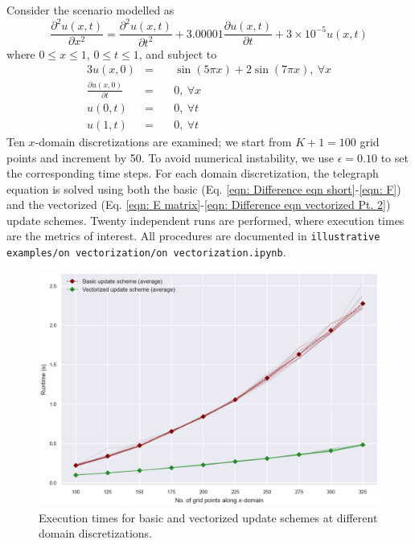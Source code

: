 \documentclass{article}
\begin{document}
Consider the scenario modelled as
\begin{equation}
   \label{eqn: Telegraph eqn for On Vectorization}
   \frac{\partial^{2} u \left(x,t\right)}{\partial x^{2}}
   =
   \frac{\partial^{2} u \left(x,t\right)}{\partial t^{2}}
   +
   3.00001 \frac{\partial u \left(x,t\right)}{\partial t}
   +
   3 \times 10^{-5} u \left(x,t\right)
\end{equation}
where $0 \leq x \leq 1$, $0 \leq t \leq 1$,
and subject to
\begin{alignat}{3}
   \label{eqn: mu for On Vectorization}
   u \left(x,0\right) &=\ && \sin \left(5 \pi x\right) + 2 \sin \left(7 \pi x\right),\ \forall x \\
   \label{eqn: xi for On Vectorization}
   \frac{\partial u \left(x,0\right)}{\partial t} &=\ && 0,\ \forall x \\
   \label{eqn: nu_0 for On Vectorization}
   u \left(0,t\right) &=\ && 0,\ \forall t \\
   \label{eqn: nu_X for On Vectorization}
   u \left(1,t\right) &=\ && 0,\ \forall t
\end{alignat}
Ten $x$-domain discretizations are examined;
we start from $K+1=100$ grid points and increment by 50.
To avoid numerical instability, we use $\epsilon = 0.10$ to set the corresponding time steps.
For each domain discretization, the telegraph equation is solved using both
the basic (Eq. \ref{eqn: Difference eqn short}-\ref{eqn: F})
and the vectorized (Eq. \ref{eqn: E matrix}-\ref{eqn: Difference eqn vectorized Pt. 2}) update schemes.
Twenty independent runs are performed, where execution times are the metrics of interest.
All procedures are documented in
{\tt illustrative examples/on vectorization/on vectorization.ipynb}.

\begin{figure}[t!]
   \centering
   \includegraphics[scale=0.75]{on vectorization.png}
   \caption{Execution times for basic and vectorized update schemes at different domain discretizations.}
	\label{fig: On Vectorization results}
\end{figure}
\end{document}
